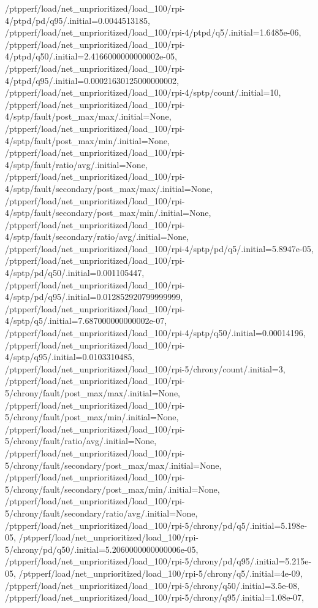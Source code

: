 {    /ptpperf/load/net_unprioritized/load_100/rpi-4/ptpd/pd/q95/.initial=0.0044513185,
    /ptpperf/load/net_unprioritized/load_100/rpi-4/ptpd/q5/.initial=1.6485e-06,
    /ptpperf/load/net_unprioritized/load_100/rpi-4/ptpd/q50/.initial=2.4166000000000002e-05,
    /ptpperf/load/net_unprioritized/load_100/rpi-4/ptpd/q95/.initial=0.00021630125000000002,
    /ptpperf/load/net_unprioritized/load_100/rpi-4/sptp/count/.initial=10,
    /ptpperf/load/net_unprioritized/load_100/rpi-4/sptp/fault/post_max/max/.initial=None,
    /ptpperf/load/net_unprioritized/load_100/rpi-4/sptp/fault/post_max/min/.initial=None,
    /ptpperf/load/net_unprioritized/load_100/rpi-4/sptp/fault/ratio/avg/.initial=None,
    /ptpperf/load/net_unprioritized/load_100/rpi-4/sptp/fault/secondary/post_max/max/.initial=None,
    /ptpperf/load/net_unprioritized/load_100/rpi-4/sptp/fault/secondary/post_max/min/.initial=None,
    /ptpperf/load/net_unprioritized/load_100/rpi-4/sptp/fault/secondary/ratio/avg/.initial=None,
    /ptpperf/load/net_unprioritized/load_100/rpi-4/sptp/pd/q5/.initial=5.8947e-05,
    /ptpperf/load/net_unprioritized/load_100/rpi-4/sptp/pd/q50/.initial=0.001105447,
    /ptpperf/load/net_unprioritized/load_100/rpi-4/sptp/pd/q95/.initial=0.012852920799999999,
    /ptpperf/load/net_unprioritized/load_100/rpi-4/sptp/q5/.initial=7.687000000000002e-07,
    /ptpperf/load/net_unprioritized/load_100/rpi-4/sptp/q50/.initial=0.00014196,
    /ptpperf/load/net_unprioritized/load_100/rpi-4/sptp/q95/.initial=0.0103310485,
    /ptpperf/load/net_unprioritized/load_100/rpi-5/chrony/count/.initial=3,
    /ptpperf/load/net_unprioritized/load_100/rpi-5/chrony/fault/post_max/max/.initial=None,
    /ptpperf/load/net_unprioritized/load_100/rpi-5/chrony/fault/post_max/min/.initial=None,
    /ptpperf/load/net_unprioritized/load_100/rpi-5/chrony/fault/ratio/avg/.initial=None,
    /ptpperf/load/net_unprioritized/load_100/rpi-5/chrony/fault/secondary/post_max/max/.initial=None,
    /ptpperf/load/net_unprioritized/load_100/rpi-5/chrony/fault/secondary/post_max/min/.initial=None,
    /ptpperf/load/net_unprioritized/load_100/rpi-5/chrony/fault/secondary/ratio/avg/.initial=None,
    /ptpperf/load/net_unprioritized/load_100/rpi-5/chrony/pd/q5/.initial=5.198e-05,
    /ptpperf/load/net_unprioritized/load_100/rpi-5/chrony/pd/q50/.initial=5.2060000000000006e-05,
    /ptpperf/load/net_unprioritized/load_100/rpi-5/chrony/pd/q95/.initial=5.215e-05,
    /ptpperf/load/net_unprioritized/load_100/rpi-5/chrony/q5/.initial=4e-09,
    /ptpperf/load/net_unprioritized/load_100/rpi-5/chrony/q50/.initial=3.5e-08,
    /ptpperf/load/net_unprioritized/load_100/rpi-5/chrony/q95/.initial=1.08e-07,
}
